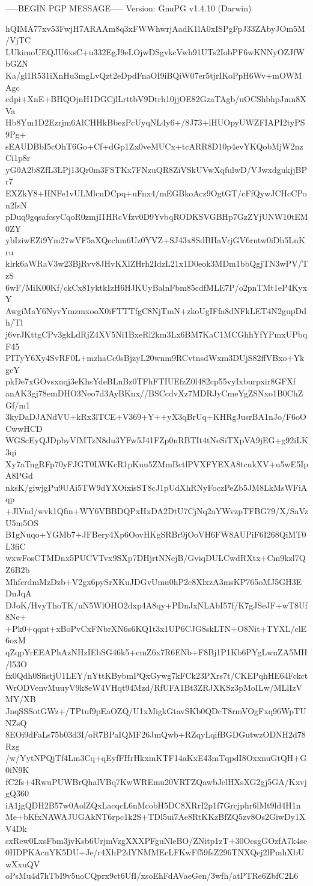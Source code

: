 -----BEGIN PGP MESSAGE-----
Version: GnuPG v1.4.10 (Darwin)

hQIMA77xv53FwjH7ARAAm8q3xFWWhwrjAadK1lA0xISPgFpJ33ZAbyJOm5M/VjTC
LUkimoUEQJU6xsC+u332EgJ9eLOjwDSgvkcVwh91UTs2IobPF6wKNNyOZJfWbGZN
Ka/gl1R531iXnHu3mgLvQzt2eDpdFnaOI9iBQiW07er5tjrIKoPpH6Wv+mOWMAgc
cdpi+XnE+BHQOjnH1DGCjlLrttbV9Dtrh10jjOE82GzaTAgb/uOCShbhpJmn8XVa
Hb8Ym1D2Ezrjm6AlCHHkBbezPcUyqNL4y6+/8J73+lHUOpyUWZFIAPI2tyPS9Pg+
sEAUDBbI5cOhT6Go+Cf+dGp1Zx0veMUCx+tcARR8D10p4evYKQobMjW2nzCi1p8r
yG0A2b8ZfL3LPj13Qr0m3FSTKx7FNzuQR8ZiVSkUVwXqfulwD/VJwxdgukjjBPr7
EXZkY8+HNFe1vULMlcnDCpq+uFnx4/mEGBkoAcz9OgtGT/cFfQywJCHcCPon2IsN
pDuq9gqsafcsyCqoR0zmjI1HRcVfzv0D9YvbqRODKSVGBHp7GzZYjUNW10tEM0ZY
ybIziwEZi9Ym27wVF5aXQechm6Uz0YVZ+SJ43x8SdBHaVrjGV6rntw0iDh5LnKru
klrk6aWRaV3w23BjRvv8JHvKXlZHrh2IdzL21x1D0eok3MDm1bbQgjTN3wPV/TzS
6wF/MiK00Kf/ckCx81yktkIzH6HJKUyBalnFbm85cdfMLE7P/o2pnTMt1eP4KyxY
AwgiMaY6NyvYmzmxooX0iFTTTfgC8NjTmN+zkoUgIFfa8dNFkLET4N2gupDdh/Tl
j6vrJKttgCPv3gkLdRjZ4XV5Ni1BxeRl2km3Lx6BM7KaC1MCGhhYfYPmxUPbqF45
PITyY6Xy4SvRF0L+mzhaCc0sBjzyL20wnm9RCvtnsdWxm3DUjS82ffVBxo+YkgcY
pkDe7xGOvsxnqj3eKhsYdeBLnBz0TFhFTIUEfzZ0l482cp55vyIxburpxir8GFXf
anAK3gj78emDHO3Neo7d3AyBKnx//BSCcdvXz7MDRJyCmeYgZSNxo1B0ChZGf/m1
3kyDaDJANdVU+kRx3lTCE+V369+Y++yX3qBrUq+KHRgJusrBA1nJo/F6oOCwwHCD
WGScEyQJDpbyVfMTzN8du3YFw5J41FZp0nRBTIt4tNeSiTXpVA9jEG+g92iLK3qi
Xy7aTngRFp70yFJGT0LWKcR1pKuu5ZMmBctlPVXFYEXA8tcukXV+u5wE5IpA8PGd
nksK/giwjgPu9UAi5TW9dYXOixisST8cJ1pUdXhRNyFoczPeZb5JM8LkMsWFiAqp
+JlVnd/wvk1Qfm+WY6VBBDQPxHxDA2DtU7CjNq2aYWvzpTFBG79/X/SaVzU5m5OS
B1gNuqo+YGMb7+JFBery4Xp6OovHKgSRBr9jOoVH6FW8AUPiF6I268QiMT0L3fiC
wxwFosCTMDnx5PUCVTvx9SXp7DHjrtNNejB/GviqDULCwdRXtx+Cm9kzl7QZ6B2b
MhfcrdmMzDzb+V2gx6pySrXKuJDGvUmu0hP2c8XlxzA3msKP765oMJ5GH3EDnJqA
DJoK/HvyThoTK/uN5WlOHO2dxp4A8qy+PDnJxNLAbI57f/K7gJSeJF+wT8Uf8Ne+
+Pk0+qqnt+xBoPvCxFNbrXN6s6KQ1t3x1UP6CJG8skLTN+O8Nit+TYXL/clE6oxM
qZqpYrEEAPhAzNHzIEbSG46k5+cmZ6x7R6ENb+F8Bj1P1Kb6PYgLwnZA5MH/l53O
fx0Qdh0SfistjU1LEY/nYttKBybmPQxGywg7kFCk23PXrs7t/CKEPqhHE64Fckct
WrODVenvMuuyV9k8eW4VHqt94Mzd/RfUFA1Bt3ZRJXKSz3pMoILw/MLlIzVMY/XB
JnqSSSotGWz+/TPtuf9pEaOZQ/U1xMigkGtavSKb0QDcT8rmVOgFxq96WpTUNZsQ
8EOi9dFaLs75b03d3I/oR7BPaIQMF26JmQwb+RZqyLqifBGDGutwzODNH2d78Rzg
/w/YytNPQjTf4Lm3Cq+qEyfFHrHkxmKTF14aKxE43mTqpdI8OxxnuGtQH+G0iN9K
fC2fs+4RwuPUWBrQhalVBq7KwWREmu20VRTZQawbJelHXsXG2gj5GA/KxvjgQ360
iA1jgQDH2B57w0AolZQxLacqcL6nMcobH5DC8XRrI2p1f7Grcjphr6lMt9ld4H1n
Me+bKfxNAWAJUGAkNT6rpc1k2S+TDl5ui7Ae8RtKKzBfZQ5zv8Os2GiwDy1XV4Dk
sxRew0LxsFbm3jvKsb6UrjmVzgXXXPFguNleBO/ZNitp1zT+30OcsgGOzfA7k4se
0HDPKAcnYK5DU+Je/r4XhP2dYNMMEcLFKwFf59fsZ296TNXQej2lPmhXbUwXxuQV
oPsMu4d7hTbI9v5uoCQprx9ct6UfI/xsoEhFdAVaeGen/3wfh/atPTRe6ZbfC2L6
